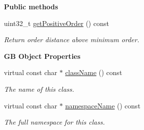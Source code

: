 \begin{Indent}\textbf{ Public methods}\par
\begin{DoxyCompactItemize}
\item 
\mbox{\label{structrev_1_1_sorting_layer_a49f7f389d118b288f3e4917100ff67a0}} 
uint32\+\_\+t \mbox{\hyperlink{structrev_1_1_sorting_layer_a49f7f389d118b288f3e4917100ff67a0}{get\+Positive\+Order}} () const
\begin{DoxyCompactList}\small\item\em Return order distance above minimum order. \end{DoxyCompactList}\end{DoxyCompactItemize}
\end{Indent}
\begin{Indent}\textbf{ GB Object Properties}\par
\begin{DoxyCompactItemize}
\item 
virtual const char $\ast$ \mbox{\hyperlink{structrev_1_1_sorting_layer_a40a55ae51e2a1e38aeb01eea9acc9bfb}{class\+Name}} () const
\begin{DoxyCompactList}\small\item\em The name of this class. \end{DoxyCompactList}\item 
virtual const char $\ast$ \mbox{\hyperlink{structrev_1_1_sorting_layer_a5923e5133aac7e650a6b4e711d5883d1}{namespace\+Name}} () const
\begin{DoxyCompactList}\small\item\em The full namespace for this class. \end{DoxyCompactList}\end{DoxyCompactItemize}
\end{Indent}
